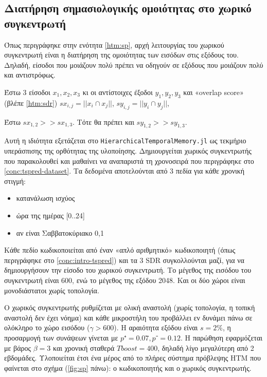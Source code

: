 \subsection{Διατήρηση σημασιολογικής ομοιότητας στο χωρικό συγκεντρωτή} \label{conc:sp-simil}

	Όπως περιγράφηκε στην ενότητα \ref{htm:sp}, αρχή λειτουργίας του χωρικού συγκεντρωτή είναι η διατήρηση της ομοιότητας των εισόδων στις εξόδους του.
	Δηλαδή, είσοδοι που μοιάζουν πολύ πρέπει να οδηγούν σε εξόδους που μοιάζουν πολύ και αντιστρόφως.

	Έστω 3 είσοδοι $x_1, x_2, x_3$ κι οι αντίστοιχες έξοδοι $y_1, y_2, y_3$
	και «overlap score» (βλέπε \ref{htm:sdr}) $\mathit{sx}_{i,j}= ||x_i ∩ x_j||$, $\mathit{sy}_{i,j}= ||y_i ∩ y_j||$,

	Έστω $\mathit{sx}_{1,2} >> \mathit{sx}_{1,3}$.
	Τότε θα πρέπει και $\mathit{sy}_{1,2} >> \mathit{sy}_{1,3}$.

	Αυτή η ιδιότητα εξετάζεται στο \texttt{HierarchicalTemporalMemory.jl} ως τεκμήριο υπεράσπισης της ορθότητας της υλοποίησης.
	Δημιουργείται χωρικός συγκεντρωτής που παρακολουθεί και μαθαίνει να αναπαριστά τη χρονοσειρά που περιγράφηκε στο \ref{conc:tspred-dataset}.
	Τα δεδομένα αποτελούνται από 3 πεδία για κάθε χρονική στιγμή:
	\begin{itemize}
		\item κατανάλωση ισχύος
		\item ώρα της ημέρας [0..24]
		\item αν είναι Σαββατοκύριακο {0,1}
	\end{itemize}

	Κάθε πεδίο κωδικοποιείται από έναν «απλό αριθμητικό» κωδικοποιητή (όπως περιγράφηκε στο \ref{conc:intro-tspred}) και τα 3 SDR συγκολλούνται μαζί,
	για να δημιουργήσουν την είσοδο του χωρικού συγκεντρωτή.
	Το μέγεθος της εισόδου του συγκεντρωτή είναι 600, ενώ το μέγεθος της εξόδου 2048.
	Και οι δύο χώροι είναι μονοδιάστατοι χωρίς τοπολογία.

	Ο χωρικός συγκεντρωτής ρυθμίζεται με ολική αναστολή (χωρίς τοπολογία, η τοπική αναστολή δεν έχει νόημα)
	και κάθε μικροστήλη του προβάλλει εν δυνάμει πάνω σε ολόκληρο το χώρο εισόδου ($γ>600$).
	Η αραιότητα εξόδου είναι $s=2\%$, η προσαρμογή των συνάψεων γίνεται με $p⁺= 0.07,p⁻= 0.12$.
	Η παρώθηση εφαρμόζεται με βάρος $β=3$ και χρονική σταθερά $Tboost=400$, δηλαδή λίγο μεγαλύτερη από 2 εβδομάδες.
	Υλοποιείται έτσι ένα μέρος από το πλήρες σύστημα πρόβλεψης HTM που φαίνεται στο σχήμα (\ref{fig:sp} πάνω): ο κωδικοποιητής και ο χωρικός συγκεντρωτής.

